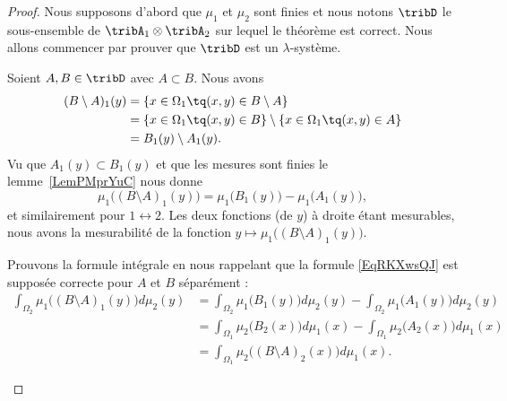 		\begin{proof}
		Nous supposons d'abord que \( \mu_1\) et \( \mu_2\) sont finies et nous notons \( \tribD\) le sous-ensemble de \( \tribA_1\otimes \tribA_2\) sur lequel le théorème est correct. Nous allons commencer par prouver que \( \tribD\) est un \( \lambda\)-système.

		\begin{subproof}
		Soient \( A,B\in\tribD\) avec \( A\subset B\). Nous avons
		\begin{subequations}
		\begin{align}
		(B\setminus A)_1(y) & =\{ x\in \Omega_1\tq(x,y)\in B\setminus A \}                               \\
													 & =\{ x\in \Omega_1\tq(x,y)\in B\}\setminus\{ x\in \Omega_1\tq(x,y)\in  A \} \\
													 & =B_1(y)\setminus A_1(y).
													 \end{align}
													 \end{subequations}
													 Vu que \( A_1(y)\subset B_1(y)\) et que les mesures sont finies le lemme~\ref{LemPMprYuC} nous donne
													 \begin{equation}
													 \mu_1\big( (B\setminus A)_1(y) \big)=\mu_1\big( B_1(y) \big)-\mu_1\big( A_1(y) \big),
													 \end{equation}
													 et similairement pour \( 1\leftrightarrow 2\). Les deux fonctions (de \( y\)) à droite étant mesurables, nous avons la mesurabilité de la fonction \( y\mapsto \mu_1\big( (B\setminus A)_1(y) \big)\).

													 Prouvons la formule intégrale en nous rappelant que la formule \eqref{EqRKXwsQJ} est supposée correcte pour \( A\) et \( B\) séparément :
													 \begin{subequations}
													 \begin{align}
													 \int_{\Omega_2}\mu_1\big( (B\setminus A)_1(y) \big)d\mu_2(y) & =\int_{\Omega_2}\mu_1\big( B_1(y) \big)d\mu_2(y)-\int_{\Omega_2}\mu_1\big( A_1(y) \big)d\mu_2(y) \\
														 & =\int_{\Omega_1}\mu_2\big( B_2(x) \big)d\mu_1(x)-\int_{\Omega_1}\mu_2\big( A_2(x) \big)d\mu_1(x) \\
														 & =\int_{\Omega_1}\mu_2\big( (B\setminus A)_2(x) \big)d\mu_1(x).
														 \end{align}
														 \end{subequations}



\end{subproof}
\end{proof}
